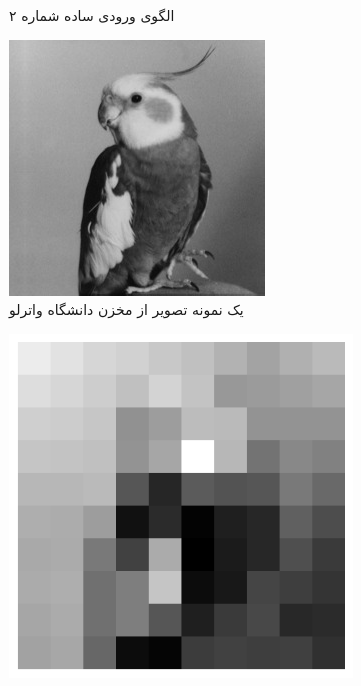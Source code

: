 \begin{figure}[H]
\begin{adjustbox}{minipage=\linewidth,scale=0.5}
\begin{subfigure}[b]{0.4\textwidth}
                    \caption{الگوی ورودی ساده شماره ۲}
                    \label{fig:simple-pattern2}
                \end{subfigure}
                \vfill
                \begin{subfigure}[b]{0.4\textwidth}
                    \centering
                    \includegraphics[width=\textwidth]{images/bird.jpg}
                    \caption{یک نمونه تصویر از مخزن دانشگاه واترلو}
                    \label{fig:waterloo-sample-original}
                \end{subfigure}
                \hfill
                \begin{subfigure}[b]{0.4\textwidth}
                    \centering
                    \includegraphics[width=\textwidth]{images/bird-resized.jpg}

\end{subfigure}
\end{adjustbox}
\end{figure}
